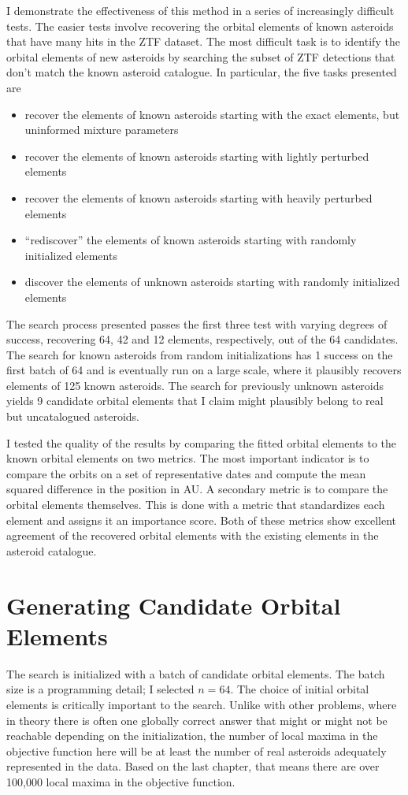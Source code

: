 I demonstrate the effectiveness of this method in a series of increasingly difficult tests.  
The easier tests involve recovering the orbital elements of known asteroids that have many hits in the ZTF dataset.
The most difficult task is to identify the orbital elements of new asteroids by searching the subset of ZTF detections that don't match the known asteroid catalogue.
In particular, the five tasks presented are
\begin{itemize}
\item recover the elements of known asteroids starting with the exact elements, but uninformed mixture parameters
\item recover the elements of known asteroids starting with lightly perturbed elements
\item recover the elements of known asteroids starting with heavily perturbed elements
\item ``rediscover'' the elements of known asteroids starting with randomly initialized elements
\item discover the elements of unknown asteroids starting with randomly initialized elements
\end{itemize}
The search process presented passes the first three test with varying degrees of success, 
recovering 64, 42 and 12 elements, respectively, out of the 64 candidates.
The search for known asteroids from random initializations has 1 success on the first batch of 64 and is eventually run on a large scale,
where it plausibly recovers elements of 125 known asteroids.
The search for previously unknown asteroids yields 9 candidate orbital elements that I claim 
might plausibly belong to real but uncatalogued asteroids.

I tested the quality of the results by comparing the fitted orbital elements to the known orbital elements on two metrics.
The most important indicator is to compare the orbits on a set of representative dates and compute the mean squared difference in the position in AU.
A secondary metric is to compare the orbital elements themselves.  
This is done with a metric that standardizes each element and assigns it an importance score.
Both of these metrics show excellent agreement of the recovered orbital elements with the existing elements in the asteroid catalogue.

\section{Generating Candidate Orbital Elements}
\label{section_candidate_elements}
The search is initialized with a batch of candidate orbital elements. 
The batch size is a programming detail; I selected $n=64$.
The choice of initial orbital elements is critically important to the search.
Unlike with other problems, where in theory there is often one globally correct answer 
that might or might not be reachable depending on the initialization, 
the number of local maxima in the objective function here will be at least the number of real asteroids adequately represented in the data.
Based on the last chapter, that means there are over 100,000 local maxima in the objective function.

